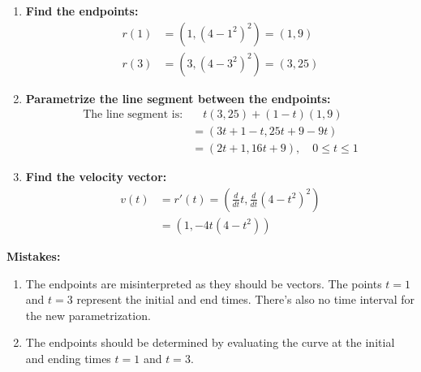 \documentclass[12pt]{article}
\theoremstyle{plain}
\theoremstyle{definition}
\theoremstyle{remark}
\renewcommand{\leq}{\leqslant}      %
\renewcommand{\:}{\colon}           %
\renewcommand{\.}{\Cdot}                %
\begin{document}
    \begin{ptcb}
\begin{enumerate}
  \item \textbf{Find the endpoints:}
  \begin{align*}
    r(1) &= (1, (4 - 1^2)^2) = (1, 9) \\
    r(3) &= (3, (4 - 3^2)^2) = (3, 25)
  \end{align*}

  \item \textbf{Parametrize the line segment between the endpoints:}
  \begin{align*}
    \text{The line segment is:} & \quad t(3, 25) + (1 - t)(1, 9) \\
    &= (3t + 1 - t, 25t + 9 - 9t) \\
    &= (2t + 1, 16t + 9), \quad 0 \leq t \leq 1
  \end{align*}

  \item \textbf{Find the velocity vector:}
  \begin{align*}
    v(t) &= r'(t) = \left( \frac{d}{dt} t, \frac{d}{dt} (4 - t^2)^2 \right) \\
    &= (1, -4t(4 - t^2))
  \end{align*}
\end{enumerate}
\textbf{Mistakes:}
\begin{enumerate}
  \item The endpoints are misinterpreted as they should be vectors. The points $t=1$ and $t=3$ represent the initial and end times. There's also no time interval for the new parametrization.
  \item The endpoints should be determined by evaluating the curve at the initial and ending times $t = 1$ and $t = 3$.
\end{enumerate}
    \end{ptcb}
    \fi
\end{document}
